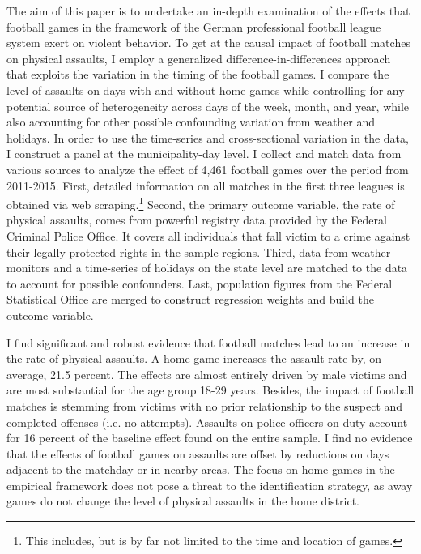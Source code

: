 The aim of this paper is to undertake an in-depth examination of the effects that football games in the framework of the German professional football league system exert on violent behavior. To get at the causal impact of football matches on physical assaults, I employ a generalized difference-in-differences approach that exploits the variation in the timing of the football games. I compare the level of assaults on days with and without home games while controlling for any potential source of heterogeneity across days of the week, month, and year, while also accounting for other possible confounding variation from weather and holidays. In order to use the time-series and cross-sectional variation in the data, I construct a panel at the municipality-day level. I collect and match data from various sources to analyze the effect of 4,461 football games over the period from 2011-2015. First, detailed information on all matches in the first three leagues is obtained via web scraping.\footnote{This includes, but is by far not limited to the time and location of games.} Second, the primary outcome variable, the rate of physical assaults, comes from powerful registry data provided by the Federal Criminal Police Office. It covers all individuals that fall victim to a crime against their legally protected rights in the sample regions. Third, data from weather monitors and a time-series of holidays on the state level are matched to the data to account for possible confounders. Last, population figures from the Federal Statistical Office are merged to construct regression weights and build the outcome variable. 



I find significant and robust evidence that football matches lead to an increase in the rate of physical assaults. A home game increases the assault rate by, on average, 21.5 percent. The effects are almost entirely driven by male victims and are most substantial for the age group 18-29 years. Besides, the impact of football matches is stemming from victims with no prior relationship to the suspect and completed offenses (i.e. no attempts). Assaults on police officers on duty account for 16 percent of the baseline effect found on the entire sample. I find no evidence that the effects of football games on assaults are offset by reductions on days adjacent to the matchday or in nearby areas. The focus on home games in the empirical framework does not pose a threat to the identification strategy, as away games do not change the level of physical assaults in the home district.




